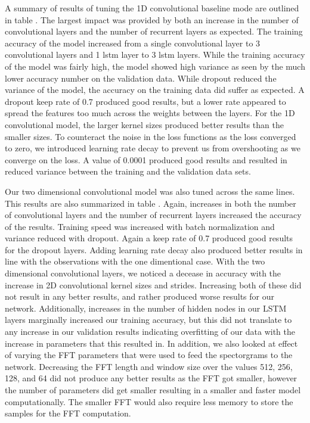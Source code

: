 \documentclass{article}
\begin{document}
A summary of results of tuning the 1D convolutional baseline mode are
outlined in table \cite{tab:summary_results}. The largest impact was
provided by both an increase in the number of convolutional layers and
the number of recurrent layers as expected. The training accuracy of
the model increased from a single convolutional layer to 3
convolutional layers and 1 lstm layer to 3 lstm layers. While the
training accuracy of the model was fairly high, the model showed high
variance as seen by the much lower accuracy number on the validation
data. While dropout reduced the variance of the model, the accuracy on
the training data did suffer as expected. A dropout keep rate of 0.7
produced good results, but a lower rate appeared to spread the
features too much across the weights between the layers. For the 1D
convolutional model, the larger kernel sizes produced better results
than the smaller sizes. To counteract the noise in the loss functions
as the loss converged to zero, we introduced learning rate decay to
prevent us from overshooting as we converge on the loss. A value of
0.0001 produced good results and resulted in reduced variance between
the training and the validation data sets.

Our two dimensional convolutional model was also tuned across the same
lines. This results are also summarized in table
\cite{tab:summary_results}. Again, increases in both the number of
convolutional layers and the number of recurrent layers increased the
accuracy of the results. Training speed was increased with batch
normalization and variance reduced with dropout. Again a keep rate of
0.7 produced good results for the dropout layers. Adding learning rate
decay also produced better results in line with the observations with
the one dimentional case. With the two
dimensional convolutional layers, we noticed a decease in accuracy
with the increase in 2D convolutional kernel sizes and
strides. Increasing both of these did not result in any better
results, and rather produced worse results for our
network. Additionally, increases in the number of hidden nodes in our
LSTM layers marginally increased our training accuracy, but this did
not translate to any increase in our validation results indicating
overfitting of our data with the increase in parameters that this
resulted in. In addition, we also looked at effect of varying the FFT
parameters that were used to feed the spectorgrams to the
network. Decreasing the FFT length and window size over the values
512, 256, 128, and 64 did not produce any better results as the FFT
got smaller, however the number of parameters did get smaller
resulting in a smaller and faster model computationally. The smaller
FFT would also require less memory to store the samples for the FFT
computation.
\end{document}

